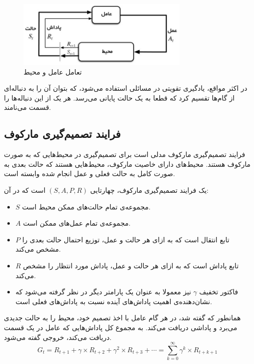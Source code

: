\begin{figure}[H]
    \centering
    \includegraphics[width=0.75\textwidth]{images/agent_env.jpg}
    \caption{تعامل عامل و محیط}\label{fig:agent_env}

\end{figure}
در اکثر مواقع، یادگیری تقویتی در مسائلی استفاده می‌شود، که بتوان آن را به دنباله‌ای از گام‌ها تقسیم کرد که قطعا به یک حالت پایانی می‌رسد.
 هر یک از این دنباله‌ها را قسمت 
  می‌نامند.
\subsection{فرایند تصمیم‌گیری مارکوف}
فرایند تصمیم‌گیری مارکوف 
  مدلی است برای تصمیم‌گیری در محیط‌هایی که به صورت مارکوف هستند.
  محیط‌های دارای خاصیت مارکوف، محیط‌هایی هستند که حالت بعدی به صورت کامل به حالت فعلی و عمل انجام شده وابسته است.


  یک فرایند تصمیم‌گیری مارکوف، چهارتایی 
  $(S, A, P, R)$
  است که در آن:
  \begin{itemize}
      \item $S$ مجموعه‌ی تمام حالت‌های ممکن محیط است.
      \item $A$ مجموعه‌ی تمام عمل‌های ممکن است.
      \item $P$ تابع انتقال 
      است که به ازای هر حالت و عمل، توزیع احتمال حالت بعدی را مشخص می‌کند.
      \item $R$ تابع پاداش 
      است که به ازای هر حالت و عمل، پاداش مورد انتظار را مشخص می‌کند.
      \item فاکتور تخفیف $\gamma$ نیز معمولا به عنوان یک پارامتر دیگر در نظر گرفته می‌شود که نشان‌دهنده‌ی اهمیت پاداش‌های آینده نسبت به پاداش‌های فعلی است.
  \end{itemize}
همانطور که گفته شد، در هر گام عامل با اخذ تصمیم خود، محیط را به حالت جدیدی می‌برد و پاداشی دریافت می‌کند.
به مجموع کل پاداش‌هایی که عامل در یک قسمت دریافت می‌کند، خروجی 
 گفته می‌شود.
 \begin{equation}\label{eq:return}
     G_t = R_{t+1} + \gamma \times R_{t+2} + \gamma^2 \times R_{t+3} + \cdots = \sum_{k=0}^\infty \gamma^k \times R_{t+k+1}
 \end{equation}
